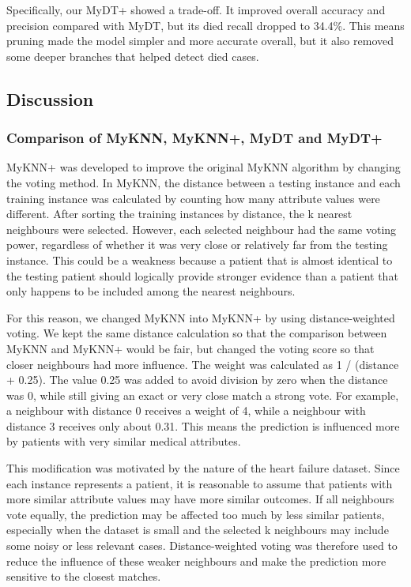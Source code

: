 \documentclass[12pt,a4paper]{article}
\begin{document}
Specifically, our MyDT+ showed a trade-off. It improved overall accuracy and precision compared with MyDT, but its died recall dropped to 34.4\%. This means pruning made the model simpler and more accurate overall, but it also removed some deeper branches that helped detect died cases.

\subsection{Discussion}
\subsubsection{Comparison of MyKNN, MyKNN+, MyDT and MyDT+}
MyKNN+ was developed to improve the original MyKNN algorithm by changing the voting method. In MyKNN, the distance between a testing instance and each training instance was calculated by counting how many attribute values were different. After sorting the training instances by distance, the k nearest neighbours were selected. However, each selected neighbour had the same voting power, regardless of whether it was very close or relatively far from the testing instance. This could be a weakness because a patient that is almost identical to the testing patient should logically provide stronger evidence than a patient that only happens to be included among the nearest neighbours.

For this reason, we changed MyKNN into MyKNN+ by using distance-weighted voting. We kept the same distance calculation so that the comparison between MyKNN and MyKNN+ would be fair, but changed the voting score so that closer neighbours had more influence. The weight was calculated as 1 / (distance + 0.25). The value 0.25 was added to avoid division by zero when the distance was 0, while still giving an exact or very close match a strong vote. For example, a neighbour with distance 0 receives a weight of 4, while a neighbour with distance 3 receives only about 0.31. This means the prediction is influenced more by patients with very similar medical attributes.

This modification was motivated by the nature of the heart failure dataset. Since each instance represents a patient, it is reasonable to assume that patients with more similar attribute values may have more similar outcomes. If all neighbours vote equally, the prediction may be affected too much by less similar patients, especially when the dataset is small and the selected k neighbours may include some noisy or less relevant cases. Distance-weighted voting was therefore used to reduce the influence of these weaker neighbours and make the prediction more sensitive to the closest matches.
\end{document}
